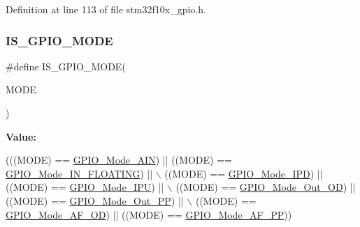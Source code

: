 Definition at line 113 of file stm32f10x\+\_\+gpio.\+h.

\mbox{\label{group___g_p_i_o___exported___types_gacc5fde3eef57ec3c558c11d0011d900c}} 
\subsubsection{\texorpdfstring{I\+S\+\_\+\+G\+P\+I\+O\+\_\+\+M\+O\+DE}{IS\_GPIO\_MODE}}
{\footnotesize\ttfamily \#define I\+S\+\_\+\+G\+P\+I\+O\+\_\+\+M\+O\+DE(\begin{DoxyParamCaption}\item[{}]{M\+O\+DE }\end{DoxyParamCaption})}

{\bfseries Value\+:}
\begin{DoxyCode}
(((MODE) == \hyperlink{group___g_p_i_o___exported___types_gga1347339e1c84a196fabbb31205eec5d4a3b9a166bf59b96c68c5c0c59811b80fc}{GPIO\_Mode\_AIN}) || ((MODE) == \hyperlink{group___g_p_i_o___exported___types_gga1347339e1c84a196fabbb31205eec5d4a0e3d2ce89b42f093d327a5e42e4d7cc2}{GPIO\_Mode\_IN\_FLOATING}) || \(\backslash\)
                            ((MODE) == \hyperlink{group___g_p_i_o___exported___types_gga1347339e1c84a196fabbb31205eec5d4ad5b7c382c280d0b14786aa7e0af783dc}{GPIO\_Mode\_IPD}) || ((MODE) == 
      \hyperlink{group___g_p_i_o___exported___types_gga1347339e1c84a196fabbb31205eec5d4adc5187fa416ea708ee4cb445ef2c59e7}{GPIO\_Mode\_IPU}) || \(\backslash\)
                            ((MODE) == \hyperlink{group___g_p_i_o___exported___types_gga1347339e1c84a196fabbb31205eec5d4a629b05b1e9adee098eaf648b044dde0b}{GPIO\_Mode\_Out\_OD}) || ((MODE) == 
      \hyperlink{group___g_p_i_o___exported___types_gga1347339e1c84a196fabbb31205eec5d4a0eee8242abb8f2f8a97bbdf0f1dc59b2}{GPIO\_Mode\_Out\_PP}) || \(\backslash\)
                            ((MODE) == \hyperlink{group___g_p_i_o___exported___types_gga1347339e1c84a196fabbb31205eec5d4ac34bf80d30de7b34444c9cbdb20695b5}{GPIO\_Mode\_AF\_OD}) || ((MODE) == 
      \hyperlink{group___g_p_i_o___exported___types_gga1347339e1c84a196fabbb31205eec5d4a5c7a69abc1bf31a8d24e896ed94bded9}{GPIO\_Mode\_AF\_PP}))
\end{DoxyCode}


